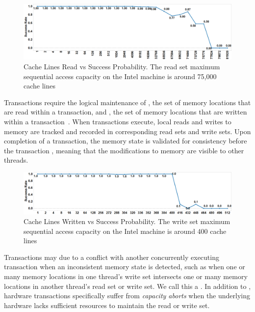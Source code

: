 \begin{figure}[H]%
\centering
\includegraphics[width=\linewidth]{images/wttm_capacity_read_intel}
\caption{Cache Lines Read vs Success Probability. The read set maximum sequential access capacity on the Intel machine is
around 75,000 cache lines}
\label{fig:wttm_capacity_read_intel}
\end{figure}



Transactions require the logical 
maintenance of , the set
of memory locations that are read within a 
transaction, and , the set
of memory locations that are written within 
a transaction~\cite{HerlihyMo93}. When transactions execute, 
local reads and writes to memory 
are tracked and recorded in
corresponding read sets and write sets. Upon 
completion of a transaction, the memory state is validated for 
consistency before the transaction
, meaning that the modifications to 
memory are visible to other threads.


\begin{figure}[H]%
\centering
\includegraphics[width=\linewidth]{images/wttm_capacity_write_intel}
\caption{Cache Lines Written vs Success Probability. 
The write set maximum sequential access capacity on the Intel machine is
around 400 cache lines}
\label{fig:wttm_capacity_write_intel}
\end{figure}

Transactions may  due to a conflict with
another concurrently executing transaction when an
inconsistent memory state is detected, 
such as when one or many memory locations
in one thread's write set intersects one or 
many memory locations in another
thread's read set or write set.  We call this a
.  In addition to ,
hardware transactions specifically suffer 
from \textit{capacity aborts} when the underlying hardware
lacks sufficient resources to maintain the
read or write set.

